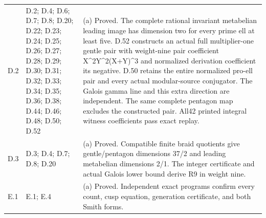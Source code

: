 \begin{longtable}{@{}p{1.1cm}p{3.0cm}p{10.3cm}@{}}
D.2 & D.2; D.4; D.6; D.7; D.8; D.20; D.22; D.23; D.24; D.25; D.26; D.27; D.28; D.29; D.30; D.31; D.32; D.33; D.34; D.35; D.36; D.38; D.44; D.46; D.48; D.50; D.52 & (a) Proved. The complete rational invariant metabelian leading image has dimension two for every prime ell at least five. D.52 constructs an actual full multiplier-one gentle pair with weight-nine pair coefficient X\textasciicircum{}2Y\textasciicircum{}2(X+Y)\textasciicircum{}3 and normalized derivation coefficient its negative. D.50 retains the entire normalized pro-ell pair and every actual modular-source conjugator. The Galois gamma line and this extra direction are independent. The same complete pentagon map excludes the constructed pair. All42 printed integral witness coefficients pass exact replay. \\
D.3 & D.3; D.4; D.7; D.8; D.20 & (a) Proved. Compatible finite braid quotients give gentle/pentagon dimensions 37/2 and leading metabelian dimensions 2/1. The integer certificate and actual Galois lower bound derive R9 in weight nine. \\
E.1 & E.1; E.4 & (a) Proved. Independent exact programs confirm every count, cusp equation, generation certificate, and both Smith forms. \\

\end{longtable}
